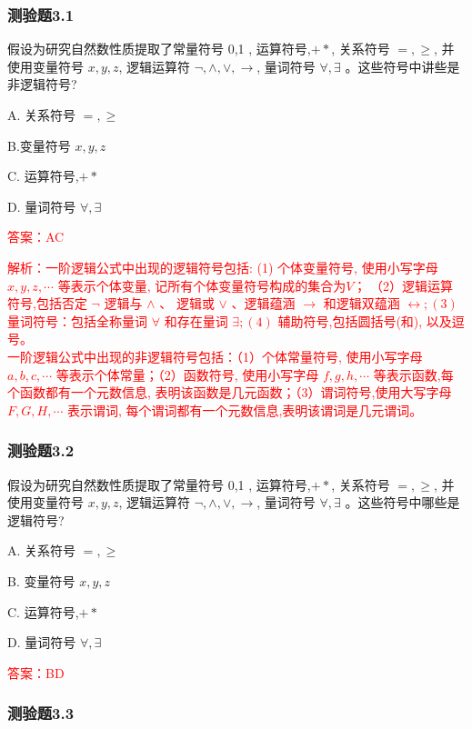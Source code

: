 \documentclass[UTF8, heading=true]{ctexart}
\begin{document}
\subsubsection{测验题3.1}

假设为研究自然数性质提取了常量符号 0,1 , 运算符号,$+ *$, 关系符号 $=, \geq$, 并使用变量符号 $x, y, z$, 逻辑运算符 $\neg, \wedge, \vee, \rightarrow$, 量词符号 $\forall, \exists$ 。这些符号中讲些是非逻辑符号?

A. 关系符号 $=, \geq$

B.变量符号 $x, y, z$

C. 运算符号,$+ *$

D. 量词符号 $\forall, \exists$

\textcolor{red}{答案：AC}

\textcolor{red}{解析：一阶逻辑公式中出现的逻辑符号包括: (1) 个体变量符号, 使用小写字母 $x, y, z, \cdots$ 等表示个体变量, 记所有个体变量符号构成的集合为$V$；
（2）逻辑运算符号,包括否定 $\neg$ 逻辑与 $\wedge$ 、
逻辑或 $\vee$ 、逻辑蕴涵 $\rightarrow$ 和逻辑双蕴涵 
$\leftrightarrow ;(3)$ 量词符号：包括全称量词 $\forall$ 
和存在量词 $\exists ;(4)$ 辅助符号,包括圆括号(和), 以及逗号。
\\ 一阶逻辑公式中出现的非逻辑符号包括：（1）个体常量符号,
使用小写字母 $a, b, c, \cdots$ 等表示个体常量；（2）函数符号,
使用小写字母 $f, g, h, \cdots$ 等表示函数,每个函数都有一个元数信息,
表明该函数是几元函数；（3）谓词符号,使用大写字母 $F, G, H, \cdots$ 表示谓词,
每个谓词都有一个元数信息,表明该谓词是几元谓词。}

\subsubsection{测验题3.2}

假设为研究自然数性质提取了常量符号 0,1 , 运算符号,$+ *$, 关系符号 $=, \geq$, 并使用变量符号 $x, y, z$, 逻辑运算符 $\neg, \wedge, \vee, \rightarrow$, 量词符号 $\forall, \exists$ 。这些符号中哪些是逻辑符号?

A. 关系符号 $=, \geq$

B. 变量符号 $x, y, z$

C. 运算符号,$+ *$

D. 量词符号 $\forall, \exists$

\textcolor{red}{答案：BD}


\subsubsection{测验题3.3}
\end{document}
